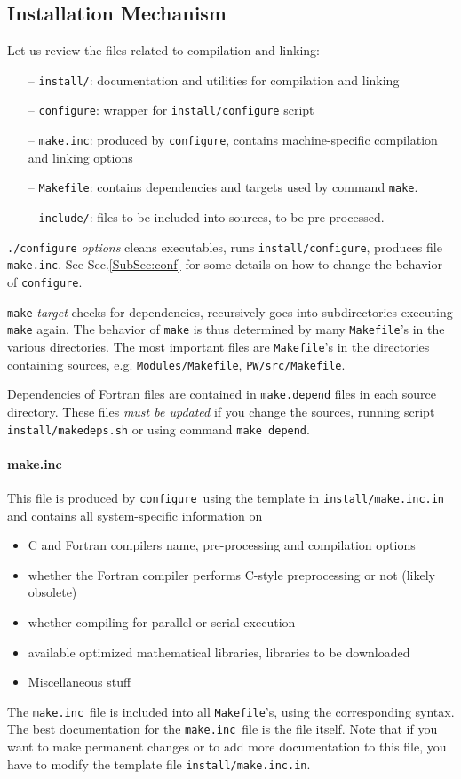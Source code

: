 \documentclass[12pt,a4paper]{article}
\def\configure{\texttt{configure}}
\def\make.inc{\texttt{make.inc}}
\def\Makefile{\texttt{Makefile}}
\begin{document}
\subsection{Installation Mechanism}

\label{SubSec:Inst}
Let us review the files related to compilation and linking:
\begin{itemize}
\item[--] \texttt{install/}: documentation and utilities for compilation
and linking
\item[--] \configure: wrapper for \texttt{install/configure} script
\item[--] \make.inc: produced by \texttt{configure}, contains
machine-specific compilation and linking options
\item[--] \Makefile: contains dependencies and targets used by
command \texttt{make}.
\item[--] \texttt{include/}: files to be included into sources, to be
pre-processed.
\end{itemize}
\texttt{./configure} {\em options} cleans executables,
runs \texttt{install/configure}, produces file \make.inc.
See Sec.\ref{SubSec:conf} for some details on how to change the
behavior of \configure.

\texttt{make} {\em target} checks for dependencies, recursively goes
into subdirectories executing \texttt{make} again. The behavior of
\texttt{make} is thus
determined by many \Makefile's in the various directories. The
most important files are \Makefile's in the directories containing
sources, e.g. \texttt{Modules/Makefile}, \texttt{PW/src/Makefile}.

Dependencies of Fortran files are contained in \texttt{make.depend} files
in each source directory. These files {\em must be updated} if you change
the sources, running script \texttt{install/makedeps.sh} or using command
\texttt{make depend}.

\paragraph{make.inc}
This file is produced by \configure\ using the template in
\texttt{install/make.inc.in} and contains all system-specific
information on
\begin{itemize}
\item C and Fortran compilers name, pre-processing and compilation options
\item whether the Fortran compiler performs C-style preprocessing or not
  (likely obsolete)
\item whether compiling for parallel or serial execution
\item available optimized mathematical libraries, libraries to be downloaded
\item Miscellaneous stuff
\end{itemize}
The \make.inc\ file is included into all \Makefile's,
using the corresponding syntax. The best documentation for the
\make.inc\ file is the file itself. Note that if you want to make
permanent changes or to add more documentation to this file,
you have to modify the template file \texttt{install/make.inc.in}.
\end{document}

